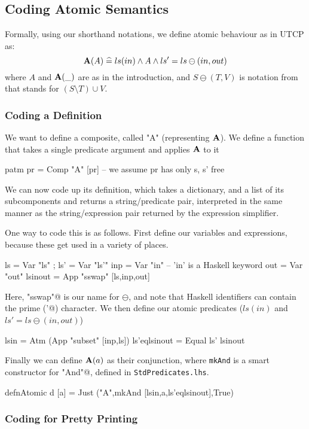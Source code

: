 \subsection{Coding Atomic Semantics}

Formally, using our shorthand notations,
we define atomic behaviour as in UTCP as:
\[
    \mathbf{A}(A) \mathrel{\widehat=} ls(in) \land A \land ls'=ls\ominus(in,out)
\]
where $A$ and $\mathbf{A}(\_)$ are as in the introduction,
and $S\ominus(T,V)$ is notation from \cite{DBLP:conf/icfem/WoodcockH02}
that stands for $(S\setminus T)\cup V$.


\subsubsection{Coding a Definition}

We want to define a composite, called "A" (representing $\mathbf{A}$).
We  define a function that takes a single predicate argument
and applies $\mathbf{A}$ to it
\begin{code}
patm pr = Comp "A" [pr] -- we assume pr has only s, s' free
\end{code}
We can now code up its definition,
which takes a dictionary, and a list of its subcomponents
and returns a string/predicate pair,
interpreted in the same manner as the string/expression pair
returned by the expression simplifier.

One way to code this is as follows.
First define our variables and expressions,
because these get used in a variety of places.
\begin{code}
ls = Var "ls" ; ls' = Var "ls'"
inp = Var "in" -- 'in' is a Haskell keyword
out = Var "out"
lsinout = App "sswap" [ls,inp,out]
\end{code}
Here, \verb@"sswap"@ is our name for $\ominus$,
and note that Haskell identifiers can contain
the prime (\verb@'@) character.
We then define our atomic predicates ($ls(in)$ and $ls'=ls\ominus(in,out)$)
\begin{code}
lsin = Atm (App "subset" [inp,ls])
ls'eqlsinout = Equal ls' lsinout
\end{code}
Finally we can define $\mathbf{A}(a)$ as their conjunction,
where \texttt{mkAnd} is a smart constructor for \verb@Comp "And"@,
defined in \texttt{StdPredicates.lhs}.
\begin{code}
defnAtomic d [a] = Just ("A",mkAnd [lsin,a,ls'eqlsinout],True)
\end{code}

\subsubsection{Coding for Pretty Printing}

